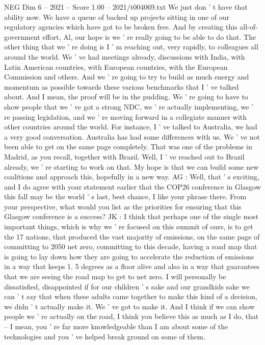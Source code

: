 \begin{textsample}{NEG Dim 6 – 2021 – Score 1.00 – 2021/t004069.txt}
We just don ' t have that ability now.
We have a queue of backed up projects sitting in one of our regulatory agencies which have got to be broken free.
And by creating this all-of-government effort, Al, our hope is we ' re really going to be able to do that.
The other thing that we ' re doing is I ' m reaching out, very rapidly, to colleagues all around the world.
We ' ve had meetings already, discussions with India, with Latin American countries, with European countries, with the European Commission and others.
And we ' re going to try to build as much energy and momentum as possible towards these various benchmarks that I ' ve talked about.
And I mean, the proof will be in the pudding.
We ' re going to have to show people that we ' ve got a strong NDC, we ' re actually implementing, we ' re passing legislation, and we ' re moving forward in a collegiate manner with other countries around the world.
For instance, I ' ve talked to Australia, we had a very good conversation.
Australia has had some differences with us.
We ' ve not been able to get on the same page completely.
That was one of the problems in Madrid, as you recall, together with Brazil.
Well, I ' ve reached out to Brazil already, we ' re starting to work on that.
My hope is that we can build some new coalitions and approach this, hopefully in a new way.
AG : Well, that ' s exciting, and I do agree with your statement earlier that the COP26 conference in Glasgow this fall may be the world ' s last, best chance, I like your phrase there.
From your perspective, what would you list as the priorities for ensuring that this Glasgow conference is a success?
JK : I think that perhaps one of the single most important things, which is why we ' re focused on this summit of ours, is to get the 17 nations, that produced the vast majority of emissions, on the same page of committing to 2050 net zero, committing to this decade, having a road map that is going to lay down how they are going to accelerate the reduction of emissions in a way that keeps 1. 5 degrees as a floor alive and also in a way that guarantees that we are seeing the road map to get to net zero.
I will personally be dissatisfied, disappointed if for our children ' s sake and our grandkids sake we can ' t say that when these adults came together to make this kind of a decision, we didn ' t actually make it.
We ' ve got to make it.
And I think if we can show people we ' re actually on the road, I think you believe this as much as I do, that -- I mean, you ' re far more knowledgeable than I am about some of the technologies and you ' ve helped break ground on some of them.

\end{textsample}
